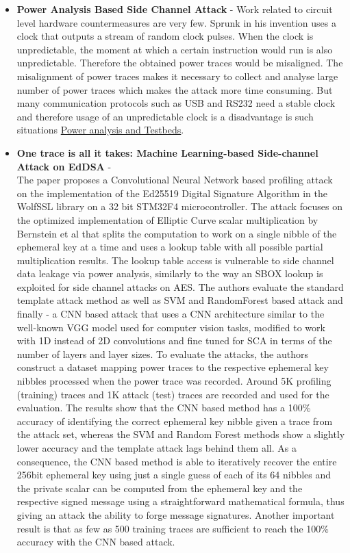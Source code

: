 \begin{itemize}
    \item  \textbf{Power Analysis Based Side Channel Attack}\cite{Power_Analysis_Hasindu} -
    Work related to circuit level hardware countermeasures are very few. 
    Sprunk in his invention uses a clock that outputs a stream of random clock pulses. 
    When the clock is unpredictable, the moment at which a certain instruction would run is also unpredictable. 
    Therefore the obtained power traces would be misaligned. The misalignment of power traces makes it necessary
    to collect and analyse large number of power traces which makes the attack more time consuming. 
    But many communication protocols such as USB and RS232 need a stable clock and
    therefore usage of an unpredictable clock is a disadvantage is such situations
    \href{https://arxiv.org/pdf/1801.00932.pdf}{Power analysis and Testbeds}.

    \item   \textbf{One trace is all it takes: Machine Learning-based Side-channel Attack on EdDSA}\cite{cryptoeprint:2019:358} - \\
    The paper proposes a Convolutional Neural Network based profiling attack on the implementation of the Ed25519 Digital Signature Algorithm in the WolfSSL library on a 32 bit STM32F4 microcontroller.
    The attack focuses on the optimized implementation of Elliptic Curve scalar multiplication by Bernstein et al\cite{Bernstein2012} that splits the computation to work on a single nibble of the ephemeral key at a time and uses a lookup table with all possible partial multiplication results.
    The lookup table access is vulnerable to side channel data leakage via power analysis, similarly to the way an SBOX lookup is exploited for side channel attacks on AES.
    The authors evaluate the standard template attack method as well as SVM and RandomForest based attack and finally - a CNN based attack that uses a CNN architecture similar to the well-known VGG model used for computer vision tasks, modified to work with 1D instead of 2D convolutions and fine tuned for SCA in terms of the number of layers and layer sizes. To evaluate the attacks, the authors construct a dataset mapping power traces to the respective ephemeral key nibbles processed when the power trace was recorded. Around 5K profiling (training) traces and 1K attack (test) traces are recorded and used for the evaluation.
    The results show that the CNN based method has a 100\% accuracy of identifying the correct ephemeral key nibble given a trace from the attack set, whereas the SVM and Random Forest methods show a slightly lower accuracy and the template attack lags behind them all. As a consequence, the CNN based method is able to iteratively recover the entire 256bit ephemeral key using just a single guess of each of its 64 nibbles and the private scalar can be computed from the ephemeral key and the respective signed message using a straightforward mathematical formula, thus giving an attack the ability to forge message signatures.
    Another important result is that as few as 500 training traces are sufficient to reach the 100\% accuracy with the CNN based attack.


\end{itemize}
